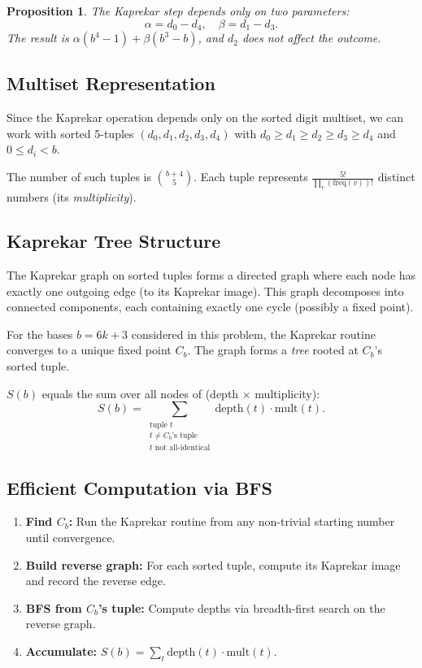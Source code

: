 \documentclass[11pt,a4paper]{article}
\newtheorem{proposition}{Proposition}
\begin{document}
\begin{proposition}
The Kaprekar step depends only on two parameters:
\[
  \alpha = d_0 - d_4, \quad \beta = d_1 - d_3.
\]
The result is $\alpha(b^4 - 1) + \beta(b^3 - b)$, and $d_2$ does not affect the outcome.
\end{proposition}

\subsection{Multiset Representation}

Since the Kaprekar operation depends only on the sorted digit multiset, we can work with sorted 5-tuples $(d_0, d_1, d_2, d_3, d_4)$ with $d_0 \ge d_1 \ge d_2 \ge d_3 \ge d_4$ and $0 \le d_i < b$.

The number of such tuples is $\binom{b+4}{5}$. Each tuple represents $\frac{5!}{\prod_v (\text{freq}(v))!}$ distinct numbers (its \emph{multiplicity}).

\subsection{Kaprekar Tree Structure}

The Kaprekar graph on sorted tuples forms a directed graph where each node has exactly one outgoing edge (to its Kaprekar image). This graph decomposes into connected components, each containing exactly one cycle (possibly a fixed point).

For the bases $b = 6k+3$ considered in this problem, the Kaprekar routine converges to a unique fixed point $C_b$. The graph forms a \emph{tree} rooted at $C_b$'s sorted tuple.

$S(b)$ equals the sum over all nodes of (depth $\times$ multiplicity):
\[
  S(b) = \sum_{\substack{\text{tuple } t \\ t \ne C_b\text{'s tuple} \\ t \text{ not all-identical}}} \text{depth}(t) \cdot \text{mult}(t).
\]

\subsection{Efficient Computation via BFS}

\begin{enumerate}
  \item \textbf{Find $C_b$:} Run the Kaprekar routine from any non-trivial starting number until convergence.
  \item \textbf{Build reverse graph:} For each sorted tuple, compute its Kaprekar image and record the reverse edge.
  \item \textbf{BFS from $C_b$'s tuple:} Compute depths via breadth-first search on the reverse graph.
  \item \textbf{Accumulate:} $S(b) = \sum_t \text{depth}(t) \cdot \text{mult}(t)$.
\end{enumerate}
\end{document}
